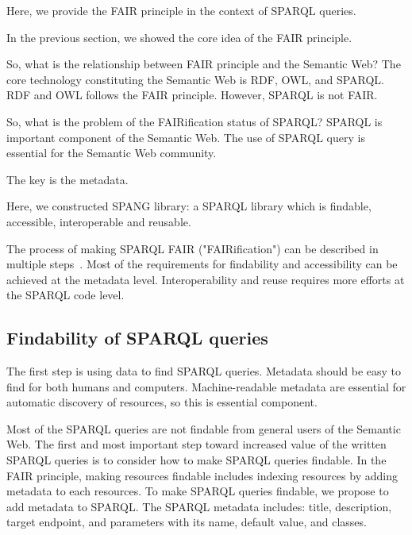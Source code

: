 \documentclass[runningheads]{llncs}
\begin{document}
Here, we provide the FAIR principle in the context of SPARQL queries.


In the previous section, we showed the core idea of the FAIR principle.

So, what is the relationship between FAIR principle and the Semantic Web?
The core technology constituting the Semantic Web is RDF, OWL, and SPARQL. RDF and OWL follows the FAIR principle. However, SPARQL is not FAIR.

So, what is the problem of the FAIRification status of SPARQL?
SPARQL is important component of the Semantic Web. The use of SPARQL query is essential for the Semantic Web community.

The key is the metadata.

Here, we constructed SPANG library: a SPARQL library which is findable, accessible, interoperable and reusable.

The process of making SPARQL FAIR ("FAIRification") can be described in multiple steps~\cite{fairification}.
Most of the requirements for findability and accessibility can be achieved at the metadata level. Interoperability and reuse requires more efforts at the SPARQL code level.


\subsection{Findability of SPARQL queries}
The first step is using data to find SPARQL queries. Metadata should be easy to find for both humans and computers. Machine-readable metadata are essential for automatic discovery of resources, so this is essential component.

Most of the SPARQL queries are not findable from general users of the Semantic Web. The first and most important step toward increased value of the written SPARQL queries is to consider how to make SPARQL queries findable.
In the FAIR principle, making resources findable includes indexing resources by adding metadata to each resources. 
To make SPARQL queries findable, we propose to add metadata to SPARQL.
The SPARQL metadata includes: title, description, target endpoint, and parameters with its name, default value, and classes.
\end{document}
